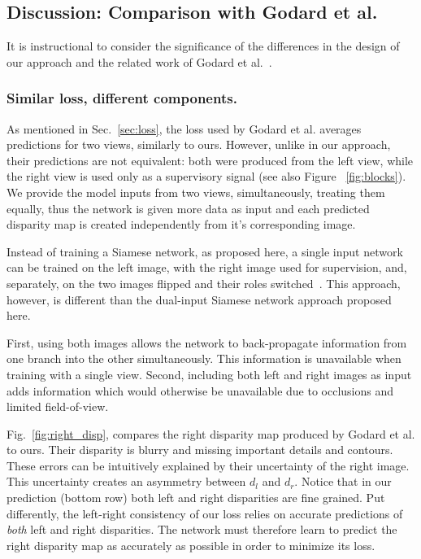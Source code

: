 \documentclass[10pt,twocolumn,letterpaper]{article}
\newcommand{\minisection}[1]{\vspace{1mm}\noindent{\textbf{#1}}}
\begin{document}
\subsection{Discussion: Comparison with Godard et al.~\cite{monodepth17}} \label{mono-discussion}
It is instructional to consider the significance of the differences in the design of our approach and the related work of Godard et al.~\cite{monodepth17}.


\subsubsection{Similar loss, different components.}
As mentioned in Sec.~\ref{sec:loss}, the loss used by Godard et al. averages predictions for two views, similarly to ours. However, unlike in our approach, their predictions are not equivalent: both were produced from the left view, while the right view is used only as a supervisory signal (see also Figure ~\ref{fig:blocks}). We provide the model inputs from two views, simultaneously, treating them equally, thus the network is given more data as input and each predicted disparity map is created independently from it's corresponding image.

\minisection{Siamese Network $\neq$ Data Augmentation.} Instead of training a Siamese network, as proposed here, a single input network can be trained on the left image, with the right image used for supervision, and, separately, on the two images flipped and their roles switched~\cite{monodepth17}. This approach, however, is different than the dual-input Siamese network approach proposed here.

First, using both images allows the network to back-propagate information from one branch into the other simultaneously. This information is unavailable when training with a single view. Second, including both left and right images as input adds information which would otherwise be unavailable due to occlusions and limited field-of-view.


Fig.~\ref{fig:right_disp}, compares the right disparity map produced by
Godard et al. to ours. Their disparity is blurry and missing important details and contours. These errors
can be intuitively explained by their uncertainty of the right image. This uncertainty creates an asymmetry between $d_l$ and $d_r$. Notice that in our prediction (bottom row) both left and
right disparities are fine grained. Put differently, the left-right consistency of our loss relies on accurate predictions of {\em both} left and right disparities. The network must therefore learn to predict the right disparity map as accurately as possible in order to minimize its loss.
\end{document}
